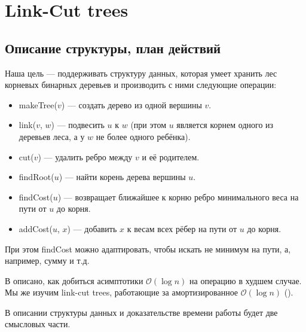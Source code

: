\section{Link-Cut trees}

\subsection{Описание структуры, план действий} 

Наша цель --- поддерживать структуру данных, которая умеет хранить лес корневых бинарных деревьев и производить с ними следующие операции:

\begin{itemize}
	\item makeTree($v$) --- создать дерево из одной вершины $v$.
	\item link($v$, $w$) --- подвесить $u$ к $w$ (при этом $u$ является корнем одного из деревьев леса, а у $w$ не более одного ребёнка).
	\item cut($v$) --- удалить ребро между $v$ и её родителем.
	\item findRoot($u$) --- найти корень дерева вершины $u$.
	\item findCost($u$) --- возвращает ближайшее к корню ребро минимального веса на пути от $u$ до корня.
	\item addCost($u$, $x$) --- добавить $x$ к весам всех рёбер на пути от $u$ до корня.
\end{itemize}

При этом findCost можно адаптировать, чтобы искать не минимум на пути, а, например, сумму и т.д.

В \cite{sleator1983linkcut} описано, как добиться асимптотики $\mathcal{O}(\log{n})$ на операцию в худшем случае. Мы же изучим link-cut trees, работающие за амортизированное $\mathcal{O}(\log{n})$ (\cite{tarjan1984linkcut}).

В описании структуры данных и доказательстве времени работы будет две смысловых части.

